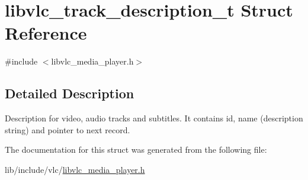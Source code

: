 \hypertarget{structlibvlc__track__description__t}{}\section{libvlc\+\_\+track\+\_\+description\+\_\+t Struct Reference}
\label{structlibvlc__track__description__t}


{\ttfamily \#include $<$libvlc\+\_\+media\+\_\+player.\+h$>$}



\subsection{Detailed Description}
Description for video, audio tracks and subtitles. It contains id, name (description string) and pointer to next record. 

The documentation for this struct was generated from the following file\+:\begin{DoxyCompactItemize}
\item 
lib/include/vlc/\hyperlink{libvlc__media__player_8h}{libvlc\+\_\+media\+\_\+player.\+h}\end{DoxyCompactItemize}
